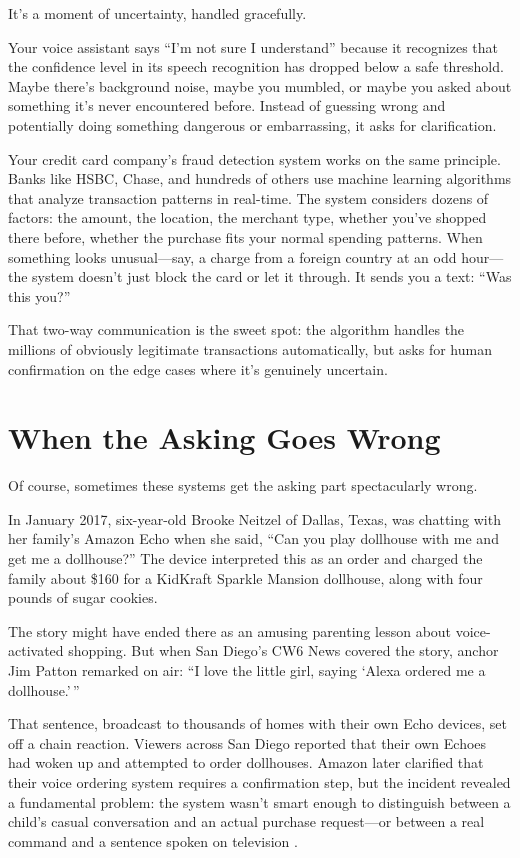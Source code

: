 It's a moment of uncertainty, handled gracefully.

Your voice assistant says ``I'm not sure I understand'' because it recognizes that the confidence level in its speech recognition has dropped below a safe threshold. Maybe there's background noise, maybe you mumbled, or maybe you asked about something it's never encountered before. Instead of guessing wrong and potentially doing something dangerous or embarrassing, it asks for clarification.

Your credit card company's fraud detection system works on the same principle. Banks like HSBC, Chase, and hundreds of others use machine learning algorithms that analyze transaction patterns in real-time. The system considers dozens of factors: the amount, the location, the merchant type, whether you've shopped there before, whether the purchase fits your normal spending patterns. When something looks unusual---say, a charge from a foreign country at an odd hour---the system doesn't just block the card or let it through. It sends you a text: ``Was this you?''

That two-way communication is the sweet spot: the algorithm handles the millions of obviously legitimate transactions automatically, but asks for human confirmation on the edge cases where it's genuinely uncertain.

\section{When the Asking Goes Wrong}

Of course, sometimes these systems get the asking part spectacularly wrong.

In January 2017, six-year-old Brooke Neitzel of Dallas, Texas, was chatting with her family's Amazon Echo when she said, ``Can you play dollhouse with me and get me a dollhouse?'' The device interpreted this as an order and charged the family about \$160 for a KidKraft Sparkle Mansion dollhouse, along with four pounds of sugar cookies.

The story might have ended there as an amusing parenting lesson about voice-activated shopping. But when San Diego's CW6 News covered the story, anchor Jim Patton remarked on air: ``I love the little girl, saying `Alexa ordered me a dollhouse.'\,''

That sentence, broadcast to thousands of homes with their own Echo devices, set off a chain reaction. Viewers across San Diego reported that their own Echoes had woken up and attempted to order dollhouses. Amazon later clarified that their voice ordering system requires a confirmation step, but the incident revealed a fundamental problem: the system wasn't smart enough to distinguish between a child's casual conversation and an actual purchase request---or between a real command and a sentence spoken on television \autocite{cbs2017dollhouse}.

